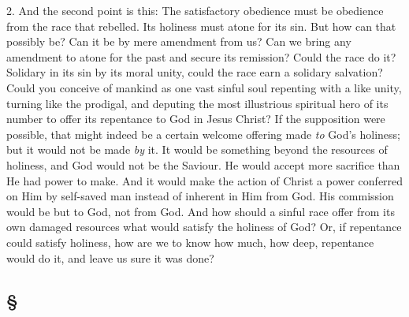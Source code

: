 \documentclass[draft]{ptfdoc}
\begin{document}
2. And the second point is this: The satisfactory 
obedience must be obedience from the race 
that rebelled. Its holiness must atone for its sin. 
But how can that possibly be? Can it be by mere 
amendment from us? Can we bring any amendment 
to atone for the past and secure its 
remission? Could the race do it? Solidary in 
its sin by its moral unity, could the race earn a 
solidary salvation? Could you conceive of mankind 
as one vast sinful soul repenting with a 
like unity, turning like the prodigal, and deputing 
the most illustrious spiritual hero of its number 
to offer its repentance to God in Jesus Christ? If 
the supposition were possible, that might indeed 
be a certain welcome offering made \textit{to} God's 
holiness; but it would not be made \textit{by} it. It 
would be something beyond the resources of 
holiness, and God would not be the Saviour. 
He would accept more sacrifice than He had 
power to make. And it would make the action 
of Christ a power conferred on Him by self-saved 
man instead of inherent in Him from 
God. His commission would be but to God, not 
from God. And how should a sinful race offer 
from its own damaged resources what would 
satisfy the holiness of God? Or, if repentance 
could satisfy holiness, how are we to know how 
much, how deep, repentance would do it, and 
leave us sure it was done? 

\subsection*{
\S
}
\end{document}
